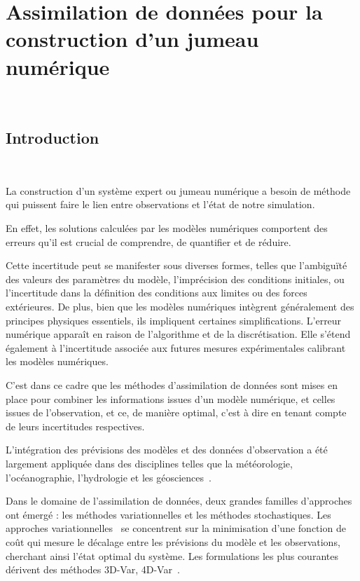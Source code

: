 
\chapter{Assimilation de données pour la construction d'un jumeau numérique}~\label{sec:da}

\section{Introduction}~\label{sec:intro_da}

La construction d'un système expert ou jumeau numérique a besoin de méthode qui puissent faire le lien entre observations et l'état de notre simulation.

En effet, les solutions calculées par les modèles numériques comportent des erreurs qu'il est crucial de comprendre, de quantifier et de réduire.

Cette incertitude peut se manifester sous diverses formes, telles que l'ambiguïté des valeurs des paramètres du modèle, l'imprécision des conditions initiales, ou l'incertitude dans la définition des conditions aux limites ou des forces extérieures. De plus, bien que les modèles numériques intègrent généralement des principes physiques essentiels, ils impliquent certaines simplifications. L'erreur numérique apparaît en raison de l'algorithme et de la discrétisation. Elle s'étend également à l'incertitude associée aux futures mesures expérimentales calibrant les modèles numériques.

C'est dans ce cadre que les méthodes d'assimilation de données sont mises en place pour combiner les informations issues d'un modèle numérique, et celles issues de l'observation, et ce, de manière optimal, c'est à dire en tenant compte de leurs incertitudes respectives.

L'intégration des prévisions des modèles et des données d'observation a été largement appliquée dans des disciplines telles que la météorologie, l'océanographie, l'hydrologie et les géosciences~\cite{bocquet_introduction_2014}.

Dans le domaine de l'assimilation de données, deux grandes familles d'approches ont émergé : les méthodes variationnelles et les méthodes stochastiques. Les approches variationnelles~\cite{variational_method} se concentrent sur la minimisation d'une fonction de coût qui mesure le décalage entre les prévisions du modèle et les observations, cherchant ainsi l'état optimal du système. Les formulations les plus courantes dérivent des méthodes 3D-Var, 4D-Var~\cite{talagrand1997assimilation}.

